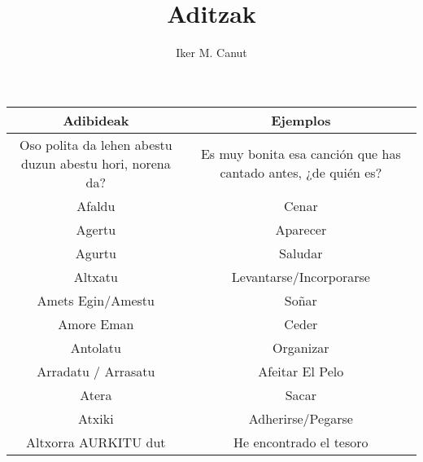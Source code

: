 \documentclass[11pt, a4paper]{article}
\begin{document}
\author{Iker M. Canut}
\date{}
\title{Aditzak\\}
\maketitle


\newpage

\begin{table}[h]
	\centering
	\begin{tabular}{cc}
		\hline
		                   \textbf{Adibideak}                    &                       \textbf{Ejemplos}                        \\ \hline
		Oso polita da lehen abestu duzun abestu hori, norena da? & Es muy bonita esa canción que has cantado antes, ¿de quién es? \\ \hline
		                         Afaldu                          &                             Cenar                              \\ \hline
		                         Agertu                          &                            Aparecer                            \\ \hline
		                         Agurtu                          &                            Saludar                             \\ \hline
		                        Altxatu                          &                    Levantarse/Incorporarse                     \\ \hline
		                   Amets Egin/Amestu                     &                             Soñar                              \\ \hline
		                       Amore Eman                        &                             Ceder                              \\ \hline
		                        Antolatu                         &                           Organizar                            \\ \hline
		                  Arradatu / Arrasatu                    &                        Afeitar El Pelo                         \\ \hline
		                         Atera                           &                             Sacar                              \\ \hline
		                         Atxiki                          &                       Adherirse/Pegarse                        \\ \hline
		                  Altxorra AURKITU dut                   &                    He encontrado el tesoro                     \\ \hline

\end{tabular}
\end{table}
\end{document}

